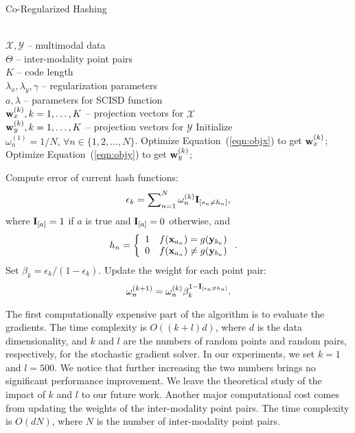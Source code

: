 \begin{algorithm}[htb]
   \caption{Co-Regularized Hashing}
   \label{alg:CRH}
\begin{algorithmic}
    \\
   $\mathcal{X},\mathcal{Y}$ -- multimodal data \\
   $\Theta$ -- inter-modality point pairs\\
   $K$ -- code length\\
   $\lambda_{x},\lambda_{y},\gamma$ -- regularization parameters\\
   $a,\lambda$ -- parameters for \mbox{SCISD} function
    \\
   ${\bf w}_{x}^{(k)}, k=1,\dots, K$ -- projection vectors for $\mathcal{X}$ \\
      ${\bf w}_{y}^{(k)}, k=1,\dots, K$ -- projection vectors for $\mathcal{Y}$ 
   \STATE
   \STATE Initialize $\omega_{n}^{(1)} = 1/N, \, \forall n \in \{1,2,\dots,N\}$.
   \REPEAT
   \STATE Optimize Equation~(\ref{eqn:objx}) to get ${\bf w}_{x}^{(k)}$;
   \STATE Optimize Equation~(\ref{eqn:objy}) to get ${\bf w}_{y}^{(k)}$;

   \STATE Compute error of current hash functions:
   \begin{align}
   \epsilon_{k} = \sum\nolimits_{n=1}^{N}\omega^{(k)}_{n}{\bf I}_{[s_{n}\ne h_{n} ]},\nonumber
   \end{align}
   where ${\bf I}_{[a]} = 1$ if $a$ is true and ${\bf I}_{[a]} = 0$ otherwise, and
   \begin{align}
   h_{n} & = \left\{ \begin{array}{ll}
            1 & f({\bf x}_{a_n}) = g({\bf y}_{b_n}) \\
            0 & f({\bf x}_{a_n}) \ne g({\bf y}_{b_n})\nonumber
                             \end{array} \right..
   \end{align}
   \STATE Set $\beta_{k} = \epsilon_{k}/(1-\epsilon_{k}).$
   \STATE Update the weight for each point pair:
   $$\omega^{(k+1)}_{n} =\omega^{(k)}_{n}\beta_{k}^{1-{\bf I}_{[s_{n}\ne h_{n}]}}.$$
   \ENDFOR
\end{algorithmic}
\end{algorithm}

The first computationally expensive part of the algorithm is to evaluate the gradients. The time complexity is $O((k+l)d)$, where $d$ is the data dimensionality, and $k$ and $l$ are the numbers of random points and random pairs, respectively, for the stochastic gradient solver. In our experiments, we set $k=1$ and $l=500$.  We notice that further increasing the two numbers brings no significant performance improvement. We leave the theoretical study of the impact of $k$ and $l$ to our future work. Another major computational cost comes from updating the weights of the inter-modality point pairs.  The time complexity is $O(dN)$, where $N$ is the number of inter-modality point pairs.

